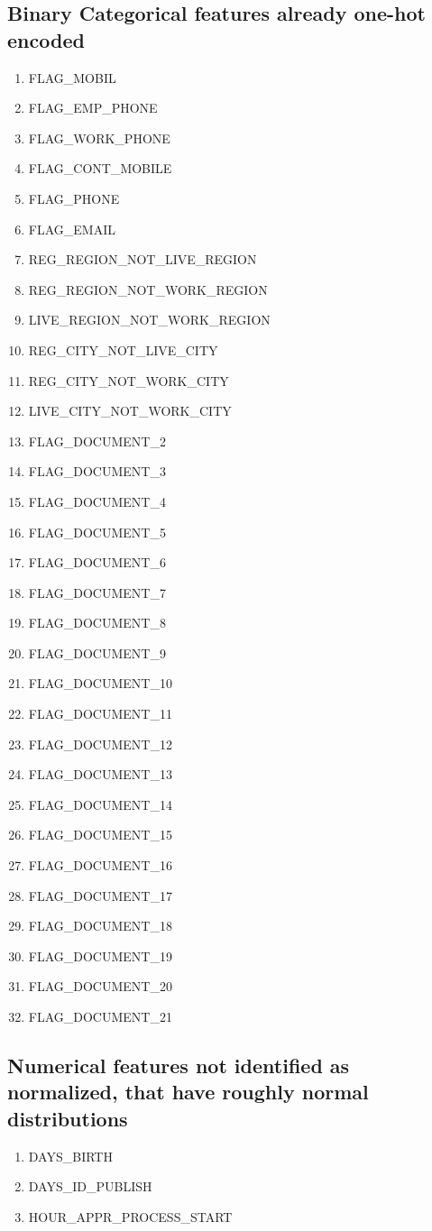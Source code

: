 \documentclass[12pt, letterpaper]{article}
\begin{document}
\begin{appendices}
\subsection{Binary Categorical features already one-hot encoded}
\label{binarycatfeatalreadyonehotencoded}
\footnotesize
\begin{enumerate}
 \item FLAG_MOBIL
 \item FLAG_EMP_PHONE
 \item FLAG_WORK_PHONE
 \item FLAG_CONT_MOBILE
 \item FLAG_PHONE
 \item FLAG_EMAIL
 \item REG_REGION_NOT_LIVE_REGION
 \item REG_REGION_NOT_WORK_REGION
 \item LIVE_REGION_NOT_WORK_REGION
 \item REG_CITY_NOT_LIVE_CITY
 \item REG_CITY_NOT_WORK_CITY
 \item LIVE_CITY_NOT_WORK_CITY
 \item FLAG_DOCUMENT_2
 \item FLAG_DOCUMENT_3
 \item FLAG_DOCUMENT_4
 \item FLAG_DOCUMENT_5
 \item FLAG_DOCUMENT_6
 \item FLAG_DOCUMENT_7
 \item FLAG_DOCUMENT_8
 \item FLAG_DOCUMENT_9
 \item FLAG_DOCUMENT_10
 \item FLAG_DOCUMENT_11
 \item FLAG_DOCUMENT_12
 \item FLAG_DOCUMENT_13
 \item FLAG_DOCUMENT_14
 \item FLAG_DOCUMENT_15
 \item FLAG_DOCUMENT_16
 \item FLAG_DOCUMENT_17
 \item FLAG_DOCUMENT_18
 \item FLAG_DOCUMENT_19
 \item FLAG_DOCUMENT_20
 \item FLAG_DOCUMENT_21
\end{enumerate}
\normalsize

\subsection{Numerical features not identified as normalized, that have roughly normal distributions}
\label{numericalfeatnotnormalizednormalshape}
\footnotesize
\begin{enumerate}
 \item DAYS_BIRTH
 \item DAYS_ID_PUBLISH
 \item HOUR_APPR_PROCESS_START
\end{enumerate}
\normalsize


\end{appendices}
\end{document}
